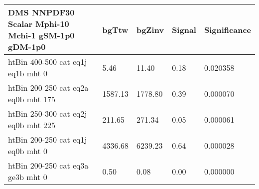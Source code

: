  \begin{tabular}{|l|l|l|l|l|}
\small
   \label{mostSensitiveBins_DMS_NNPDF30_Scalar_Mphi-10_Mchi-1_gSM-1p0_gDM-1p0_25ns}
	\textbf{DMS NNPDF30 Scalar Mphi-10 Mchi-1 gSM-1p0 gDM-1p0}	 & 	bgTtw	 & 	bgZinv	 & 	Signal &	 Significance \\ 
	\hline
	htBin 400-500 cat eq1j eq1b mht 0 & 	5.46	 & 	11.40	 & 	0.18 	&0.020358 \\ 
	htBin 200-250 cat eq2a eq0b mht 175 & 	1587.13	 & 	1778.80	 & 	0.39 	&0.000070 \\ 
	htBin 250-300 cat eq2j eq0b mht 225 & 	211.65	 & 	271.34	 & 	0.05 	&0.000061 \\ 
	htBin 200-250 cat eq1j eq0b mht 0 & 	4336.68	 & 	6239.23	 & 	0.64 	&0.000028 \\ 
	htBin 200-250 cat eq3a ge3b mht 0 & 	0.50	 & 	0.08	 & 	0.00 	&0.000000 \\ 
\end{tabular}
